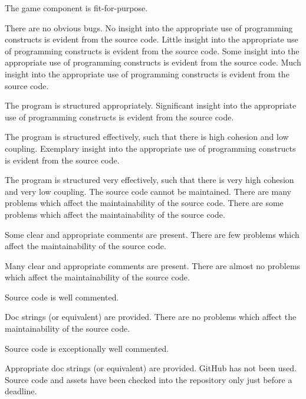 \documentclass{../fal_assignment}
\begin{document}
\begin{markingrubric}
        \grade 		The game component is fit-for-purpose.
        \par 		There are no obvious bugs.
%
        \grade\fail 	No insight into the appropriate use of programming constructs is evident from the source code.
        \grade 		Little insight into the appropriate use of programming constructs is evident from the source code.
        \grade 		Some insight into the appropriate use of programming constructs is evident from the source code.
        \grade 		Much insight into the appropriate use of programming constructs is evident from the source code.
        \par 		The program is structured appropriately.
        \grade 		Significant insight into the appropriate use of programming constructs is evident from the source code.
        \par 		The program is structured effectively, such that there is high cohesion and low coupling.
        \grade 		Exemplary insight into the appropriate use of programming constructs is evident from the source code.
        \par 		The program is structured very effectively, such that there is very high cohesion and very low coupling.
%
        \grade\fail 	The source code cannot be maintained.
        \grade 		There are many problems which affect the maintainability of the source code.
        \grade 		There are some problems which affect the maintainability of the source code. 
        \par 		Some clear and appropriate comments are present.
        \grade 		There are few problems which affect the maintainability of the source code. 
        \par 		Many clear and appropriate comments are present.
        \grade 		There are almost no problems which affect the maintainability of the source code. 
        \par 		Source code is well commented.
        \par 		Doc strings (or equivalent) are provided.       
        \grade 		There are no problems which affect the maintainability of the source code.
        \par 		Source code is exceptionally well commented.
        \par 		Appropriate doc strings (or equivalent) are provided. 
%
        \grade\fail 	GitHub has not been used.
        \grade 		Source code and assets have been checked into the repository only just before a deadline.

\end{markingrubric}
\end{document}

